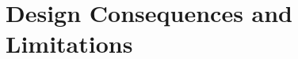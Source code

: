 \section{Design Consequences and Limitations}
\label{sec:loosening-design-consequences-limitations}


